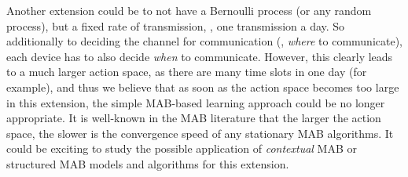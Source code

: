 Another extension could be to not have a Bernoulli process (or any random process), but a fixed rate of transmission, \eg, one transmission a day.
So additionally to deciding the channel for communication (\ie, \emph{where} to communicate), each device has to also decide \emph{when} to communicate.
However, this clearly leads to a much larger action space, as there are many time slots in one day (for example), and thus we believe that as soon as the action space becomes too large in this extension, the simple MAB-based learning approach could be no longer appropriate.
It is well-known in the MAB literature that the larger the action space, the slower is the convergence speed of any stationary MAB algorithms.
It could be exciting to study the possible application of \emph{contextual} MAB \cite{Li10,Luo18} or structured MAB \cite{Combes17} models and algorithms for this extension.







